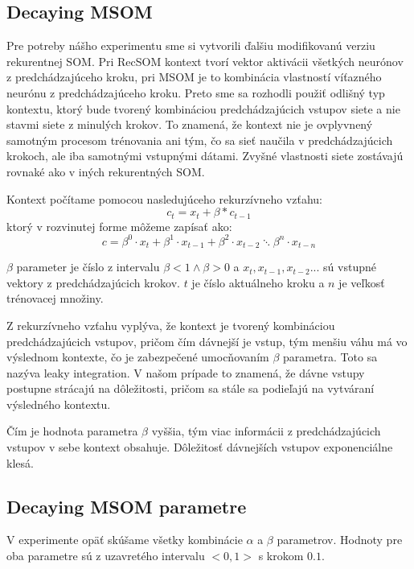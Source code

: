 

\subsection{Decaying MSOM}
Pre potreby nášho experimentu sme si vytvorili ďalšiu modifikovanú verziu %
rekurentnej SOM. Pri RecSOM kontext tvorí vektor aktivácii všetkých neurónov z predchádzajúceho kroku, 
pri MSOM je to kombinácia vlastností víťazného neurónu z predchádzajúceho kroku. 
Preto sme sa rozhodli použiť odlišný typ kontextu, ktorý bude tvorený kombináciou predchádzajúcich vstupov 
siete a nie stavmi siete z minulých krokov. To znamená, že kontext nie je ovplyvnený samotným procesom trénovania
ani tým, čo sa sieť naučila v predchádzajúcich krokoch, ale iba samotnými vstupnými dátami.
Zvyšné vlastnosti siete zostávajú rovnaké ako v iných rekurentných SOM.

Kontext počítame pomocou nasledujúceho rekurzívneho vzťahu:
\begin{equation}
    c_{t} = x_{t} + \beta * c_{t-1}
\end{equation}
ktorý v rozvinutej forme môžeme zapísať ako:
\begin{equation}
	c = \beta^{0} \cdot x_{t} + \beta^{1} \cdot x_{t-1} + 
	\beta^{2} \cdot x_{t-2} \ddots \beta^{n} \cdot x_{t-n}
\end{equation}

$\beta$ parameter je číslo z intervalu $\beta < 1 \wedge \beta > 0$ a
$x_t, x_{t-1}, x_{t-2} ...$ sú vstupné vektory z predchádzajúcich krokov.
$t$ je číslo aktuálneho kroku a $n$ je veľkosť trénovacej množiny.

Z rekurzívneho vzťahu vyplýva, že kontext je tvorený kombináciou predchádzajúcich vstupov,
pričom čím dávnejší je vstup, tým menšiu váhu má vo výslednom kontexte, čo je zabezpečené umocňovaním
$\beta$ parametra. Toto sa nazýva leaky integration. V našom prípade
to znamená, že dávne vstupy postupne strácajú na dôležitosti, pričom sa stále sa podieľajú 
na vytváraní výsledného kontextu.

Čím je hodnota parametra $\beta$ vyššia, tým viac informácii z predchádzajúcich vstupov v sebe
kontext obsahuje. Dôležitosť dávnejších vstupov exponenciálne klesá.

\subsection{Decaying MSOM parametre}
V experimente opäť skúšame všetky kombinácie $\alpha$ a $\beta$ parametrov.
Hodnoty pre oba parametre sú z uzavretého intervalu $<0, 1>$ s krokom $0.1$.

